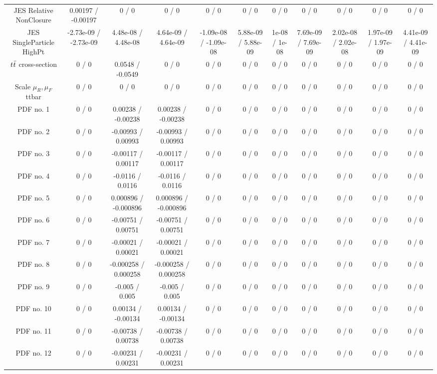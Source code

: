 {\begin{landscape}
\begin{longtable}{@{\extracolsep{\fill}}| *{11}{c|}}
  JES Relative NonClosure & 0.00197 / -0.00197 & 0 / 0 & 0 / 0 & 0 / 0 & 0 / 0 & 0 / 0 & 0 / 0 & 0 / 0 & 0 / 0 & 0 / 0 \\ 
  JES SingleParticle HighPt & -2.73e-09 / -2.73e-09 & 4.48e-08 / 4.48e-08 & 4.64e-09 / 4.64e-09 & -1.09e-08 / -1.09e-08 & 5.88e-09 / 5.88e-09 & 1e-08 / 1e-08 & 7.69e-09 / 7.69e-09 & 2.02e-08 / 2.02e-08 & 1.97e-09 / 1.97e-09 & 4.41e-09 / 4.41e-09 \\ 
  $\it{t\bar{t}}$ cross-section & 0 / 0 & 0.0548 / -0.0549 & 0 / 0 & 0 / 0 & 0 / 0 & 0 / 0 & 0 / 0 & 0 / 0 & 0 / 0 & 0 / 0 \\ 
  Scale $\mu_{R},\mu_{F} $ ttbar & 0 / 0 & 0 / 0 & 0 / 0 & 0 / 0 & 0 / 0 & 0 / 0 & 0 / 0 & 0 / 0 & 0 / 0 & 0 / 0 \\ 
  PDF no. 1 & 0 / 0 & 0.00238 / -0.00238 & 0.00238 / -0.00238 & 0 / 0 & 0 / 0 & 0 / 0 & 0 / 0 & 0 / 0 & 0 / 0 & 0 / 0 \\ 
  PDF no. 2 & 0 / 0 & -0.00993 / 0.00993 & -0.00993 / 0.00993 & 0 / 0 & 0 / 0 & 0 / 0 & 0 / 0 & 0 / 0 & 0 / 0 & 0 / 0 \\ 
  PDF no. 3 & 0 / 0 & -0.00117 / 0.00117 & -0.00117 / 0.00117 & 0 / 0 & 0 / 0 & 0 / 0 & 0 / 0 & 0 / 0 & 0 / 0 & 0 / 0 \\ 
  PDF no. 4 & 0 / 0 & -0.0116 / 0.0116 & -0.0116 / 0.0116 & 0 / 0 & 0 / 0 & 0 / 0 & 0 / 0 & 0 / 0 & 0 / 0 & 0 / 0 \\ 
  PDF no. 5 & 0 / 0 & 0.000896 / -0.000896 & 0.000896 / -0.000896 & 0 / 0 & 0 / 0 & 0 / 0 & 0 / 0 & 0 / 0 & 0 / 0 & 0 / 0 \\ 
  PDF no. 6 & 0 / 0 & -0.00751 / 0.00751 & -0.00751 / 0.00751 & 0 / 0 & 0 / 0 & 0 / 0 & 0 / 0 & 0 / 0 & 0 / 0 & 0 / 0 \\ 
  PDF no. 7 & 0 / 0 & -0.00021 / 0.00021 & -0.00021 / 0.00021 & 0 / 0 & 0 / 0 & 0 / 0 & 0 / 0 & 0 / 0 & 0 / 0 & 0 / 0 \\ 
  PDF no. 8 & 0 / 0 & -0.000258 / 0.000258 & -0.000258 / 0.000258 & 0 / 0 & 0 / 0 & 0 / 0 & 0 / 0 & 0 / 0 & 0 / 0 & 0 / 0 \\ 
  PDF no. 9 & 0 / 0 & -0.005 / 0.005 & -0.005 / 0.005 & 0 / 0 & 0 / 0 & 0 / 0 & 0 / 0 & 0 / 0 & 0 / 0 & 0 / 0 \\ 
  PDF no. 10 & 0 / 0 & 0.00134 / -0.00134 & 0.00134 / -0.00134 & 0 / 0 & 0 / 0 & 0 / 0 & 0 / 0 & 0 / 0 & 0 / 0 & 0 / 0 \\ 
  PDF no. 11 & 0 / 0 & -0.00738 / 0.00738 & -0.00738 / 0.00738 & 0 / 0 & 0 / 0 & 0 / 0 & 0 / 0 & 0 / 0 & 0 / 0 & 0 / 0 \\ 
  PDF no. 12 & 0 / 0 & -0.00231 / 0.00231 & -0.00231 / 0.00231 & 0 / 0 & 0 / 0 & 0 / 0 & 0 / 0 & 0 / 0 & 0 / 0 & 0 / 0 \\ 

\end{longtable}
\end{landscape}}
